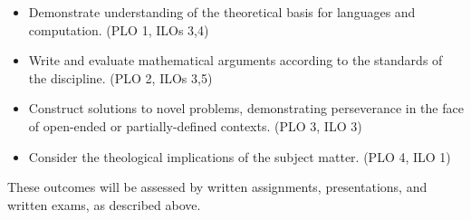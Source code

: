 \documentclass[
  twoside]{article}
\begin{document}
\begin{description}
\begin{itemize}
    \item Demonstrate understanding of the theoretical basis for languages and computation.
             (PLO 1, ILOs 3,4)
    \item Write and evaluate mathematical arguments according to the
             standards of the discipline. (PLO 2,
              ILOs 3,5)
    \item Construct solutions to novel problems,
               demonstrating perseverance in the face of open-ended or
               partially-defined contexts. (PLO 3, ILO 3)
    \item Consider the theological implications of the subject matter. (PLO 4, ILO 1)
\end{itemize}
These outcomes will be assessed by written assignments, presentations, and written exams, as described above.

\end{description}
\end{document}
